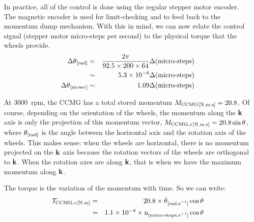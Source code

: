 In practice, all of the control is done using the regular stepper motor encoder. The magnetic encoder is used for limit-checking and to feed back to the momentum dump mechanism. With this in mind, we can now relate the control signal (stepper motor micro-steps per second) to the physical torque that the wheels provide. 
\begin{eqnarray}
\Delta\theta{}_{[\textrm{rad}]} &= &\frac{2\pi}{92.5\times 200\times 64}\Delta(\textrm{micro-steps}) \\ 
& \sim & 5.3\times 10^{-6} \Delta(\textrm{micro-steps})\\
\Delta\theta{}_{[\textrm{arcsec}]} &\sim &  1.09 \Delta(\textrm{micro-steps})
\end{eqnarray}

At 3000~rpm, the CCMG has a total stored momentum $M_{\textrm{CCMG}}{}_{[\textrm{\textrm{N.m.s}}]} = 20.8$. Of course, depending on the orientation of the wheels, the momentum along the $\textrm{\textbf{k}}$ axis is only the projection of this momentum vector, $M_{\textrm{CCMG},z}{}_{[\textrm{\textrm{N.m.s}}]} = 20.8\sin\theta$, where $\theta{}_{[\textrm{\textrm{rad}}]}$ is the angle between the horizontal axis and the rotation axis of the wheels. This makes sense: when the wheels are horizontal, there is no momentum projected on the $\textrm{\textbf{k}}$ axis because the rotation vectors of the wheels are orthogonal to $\textrm{\textbf{k}}$. When the rotation axes are along $\textrm{\textbf{k}}$, that is when we have the maximum momentum along $\textrm{\textbf{k}}$. 

The torque is the variation of the momentum with time. So we can write:
\begin{eqnarray}
\mathcal{T}_{\textrm{CCMG},z}{}_{[\textrm{N.m}]} &= & 20.8\times \dot{\theta}{}_{[\textrm{rad.s$^{-1}$}]} \cos\theta\\
 &= & 1.1\times 10^{-4}\times \textrm{n}{}_{[\textrm{micro-steps.s$^{-1}$}]}\cos\theta
\end{eqnarray}

\begin{figure}[!ht]
	\centering
	
	\caption{}
	\label{fig:CCMGnocase}
    \end{figure}

